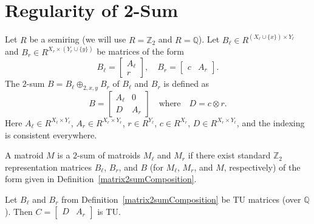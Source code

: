 \chapter{Regularity of 2-Sum}

\begin{definition}
    \label{matrix2sumComposition}
    \leanok
    Let $R$ be a semiring (we will use $R = \mathbb{Z}_{2}$ and $R = \mathbb{Q}$). Let $B_{\ell} \in R^{(X_{\ell} \cup \{x\}) \times Y_{\ell}}$ and $B_{r} \in R^{X_{r} \times (Y_{r} \cup \{y\})}$ be matrices of the form
    \[
        B_{\ell} = \begin{bmatrix} A_{\ell} \\ r \end{bmatrix}, \quad
        B_{r} = \begin{bmatrix} c & A_{r} \end{bmatrix}.
    \]
    The $2$-sum $B = B_{\ell} \oplus_{2, x, y} B_{r}$ of $B_{\ell}$ and $B_{r}$ is defined as
    \[
        B = \begin{bmatrix} A_{\ell} & 0 \\ D & A_{r} \end{bmatrix}
        \quad \text{where} \quad
        D = c \otimes r.
    \]
    Here $A_{\ell} \in R^{X_{\ell} \times Y_{\ell}}$, $A_{r} \in R^{X_{r} \times Y_{r}}$, $r \in R^{Y_{\ell}}$, $c \in R^{X_{r}}$, $D \in R^{X_{r} \times Y_{\ell}}$, and the indexing is consistent everywhere.
\end{definition} %

\begin{definition}
    \label{Matroid.Is2sumOf}
    \leanok
    A matroid $M$ is a $2$-sum of matroids $M_{\ell}$ and $M_{r}$ if there exist standard $\mathbb{Z}_{2}$ representation matrices $B_{\ell}$, $B_{r}$, and $B$ (for $M_{\ell}$, $M_{r}$, and $M$, respectively) of the form given in Definition~\ref{matrix2sumComposition}.
\end{definition}

\begin{lemma}
    \label{Matrix.IsTotallyUnimodular.fromCols_outer}
    \leanok
    Let $B_{\ell}$ and $B_{r}$ from Definition~\ref{matrix2sumComposition} be TU matrices (over $\mathbb{Q}$). Then $C = \begin{bmatrix} D & A_{r} \end{bmatrix}$ is TU.
\end{lemma}

